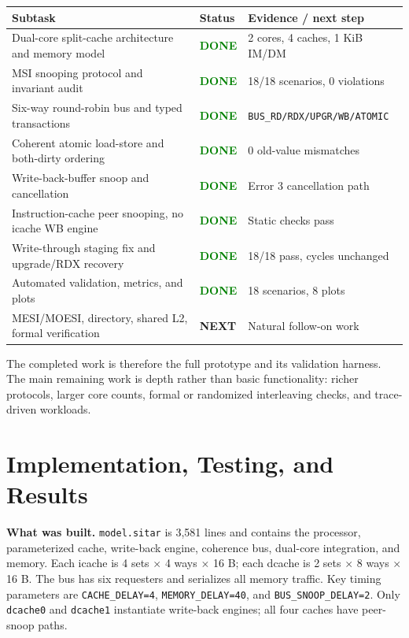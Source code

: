 \documentclass[11pt,a4paper]{article}
\newcommand{\code}[1]{\texttt{\small #1}}
\newcommand{\done}{\textcolor{green}{\textbf{DONE}}}
\newcommand{\future}{\textcolor{amber}{\textbf{NEXT}}}
\begin{document}
\begin{center}
\small
\begin{tabularx}{\textwidth}{@{}p{}p{}X@{}}
\toprule
\textbf{Subtask} & \textbf{Status} & \textbf{Evidence / next step} \\
\midrule
Dual-core split-cache architecture and memory model & \done & 2 cores, 4 caches, 1 KiB IM/DM \\
MSI snooping protocol and invariant audit & \done & 18/18 scenarios, 0 violations \\
Six-way round-robin bus and typed transactions & \done & \code{BUS\_RD/\allowbreak RDX/\allowbreak UPGR/\allowbreak WB/\allowbreak ATOMIC} \\
Coherent atomic load-store and both-dirty ordering & \done & 0 old-value mismatches \\
Write-back-buffer snoop and cancellation & \done & Error 3 cancellation path \\
Instruction-cache peer snooping, no icache WB engine & \done & Static checks pass \\
Write-through staging fix and upgrade/RDX recovery & \done & 18/18 pass, cycles unchanged \\
Automated validation, metrics, and plots & \done & 18 scenarios, 8 plots \\
MESI/MOESI, directory, shared L2, formal verification & \future & Natural follow-on work \\
\bottomrule
\end{tabularx}
\end{center}

The completed work is therefore the full prototype and its validation harness. The main
remaining work is depth rather than basic functionality: richer protocols, larger core
counts, formal or randomized interleaving checks, and trace-driven workloads.

\section{Implementation, Testing, and Results}
\textbf{What was built.} \code{model.sitar} is 3,581 lines and contains the processor,
parameterized cache, write-back engine, coherence bus, dual-core integration, and memory.
Each icache is 4 sets $\times$ 4 ways $\times$ 16 B; each dcache is 2 sets $\times$ 8 ways
$\times$ 16 B. The bus has six requesters and serializes all memory traffic. Key timing
parameters are \code{CACHE\_DELAY=4}, \code{MEMORY\_DELAY=40}, and
\code{BUS\_SNOOP\_DELAY=2}. Only \code{dcache0} and \code{dcache1} instantiate write-back
engines; all four caches have peer-snoop paths.
\end{document}
